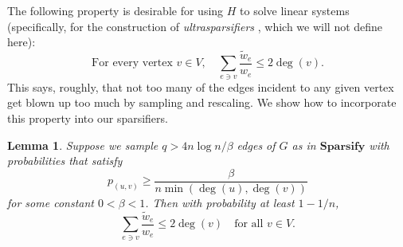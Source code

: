 \documentclass[11pt]{article}
\newtheorem{lem}{Lemma}
\begin{document}
The following property is desirable for using $H$ to solve linear systems
(specifically, for the construction of {\em ultrasparsifiers} \cite{st04,st06}, which we will not 
define here):
\begin{equation}\label{ultraprop} \textrm{For every vertex $v\in V,$}\quad
\sum_{e\ni v} \frac{\tilde{w}_e}{w_e}\le 2\deg(v).\end{equation}
This says, roughly, that not too many of the edges incident to any given vertex
get blown up too much by sampling and rescaling.
We show how to incorporate this property into our sparsifiers.
\begin{lem} \label{mindeg} Suppose we sample $q > 4 n \log n / \beta $ edges of $G$ as in
$\mathbf{Sparsify}$ with probabilities that satisfy
\[ p_{(u,v)} \ge \frac{\beta}{n\min(\deg(u),\deg(v))}\] for some constant
$0<\beta<1$. Then with probability at least $1-1/n$,
\[ \sum_{e\ni v} \frac{\tilde{w}_e}{w_e} \le 2\deg(v)\quad\textrm{for all $v\in
V$.}\]
\end{lem}
\end{document}
